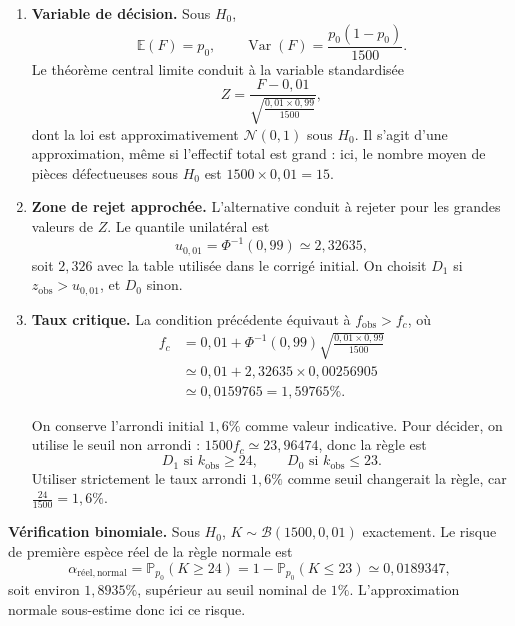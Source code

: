 {\begin{enumerate}
{\begin{enumerate}
\item \textbf{Variable de décision.} Sous $H_0$,
\[
\mathbb E(F)=p_0,\qquad
\operatorname{Var}(F)=\frac{p_0(1-p_0)}{1500}.
\]
Le théorème central limite conduit à la variable standardisée
\[
Z=\frac{F-0{,}01}{\sqrt{\frac{0{,}01\times0{,}99}{1500}}},
\]
dont la loi est approximativement $\mathcal N(0,1)$ sous $H_0$. Il s'agit d'une approximation, même si l'effectif total est grand : ici, le nombre moyen de pièces défectueuses sous $H_0$ est $1500\times0{,}01=15$.

\item \textbf{Zone de rejet approchée.} L'alternative conduit à rejeter pour les grandes valeurs de $Z$. Le quantile unilatéral est
\[
u_{0{,}01}=\Phi^{-1}(0{,}99)\simeq2{,}32635,
\]
soit $2{,}326$ avec la table utilisée dans le corrigé initial. On choisit $D_1$ si $z_{\mathrm{obs}}>u_{0{,}01}$, et $D_0$ sinon.

\item \textbf{Taux critique.} La condition précédente équivaut à $f_{\mathrm{obs}}>f_c$, où
\begin{align*}
f_c&=0{,}01+\Phi^{-1}(0{,}99)\sqrt{\frac{0{,}01\times0{,}99}{1500}}\\
&\simeq0{,}01+2{,}32635\times0{,}00256905\\
&\simeq0{,}0159765=1{,}59765\%.
\end{align*}
\begin{minipage}{\linewidth}
On conserve l'arrondi initial $1{,}6\%$ comme valeur indicative. Pour décider, on utilise le seuil non arrondi : $1500f_c\simeq23{,}96474$, donc la règle est
\[
D_1\text{ si }k_{\mathrm{obs}}\geq24,
\qquad D_0\text{ si }k_{\mathrm{obs}}\leq23.
\]
Utiliser strictement le taux arrondi $1{,}6\%$ comme seuil changerait la règle, car $\frac{24}{1500}=1{,}6\%$.
\end{minipage}
\end{enumerate}

\textbf{Vérification binomiale.} Sous $H_0$, $K\sim\mathcal B(1500,0{,}01)$ exactement. Le risque de première espèce réel de la règle normale est
\[
\alpha_{\mathrm{réel,normal}}
=\mathbb P_{p_0}(K\geq24)
=1-\mathbb P_{p_0}(K\leq23)
\simeq0{,}0189347,
\]
soit environ $1{,}8935\%$, supérieur au seuil nominal de $1\%$.
L'approximation normale sous-estime donc ici ce risque.

}
\end{enumerate}}
